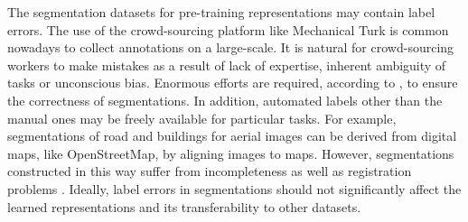 
The segmentation datasets for pre-training representations may contain label errors.
The use of the crowd-sourcing platform like Mechanical Turk is common nowadays to collect annotations on a large-scale.
It is natural for crowd-sourcing workers to make mistakes as a result of lack of expertise, inherent ambiguity of tasks or unconscious bias.
Enormous efforts are required, according to  \cite{lin2014microsoft,everingham2015pascal}, to ensure the correctness of segmentations.
In addition, automated labels other than the manual ones may be freely available for particular tasks.
For example, segmentations of road and buildings for aerial images can be derived from digital maps, like OpenStreetMap, by aligning images to maps.
However, segmentations constructed in this way suffer from incompleteness as well as registration problems \cite{mnih2012learning}.
Ideally, label errors in segmentations should not significantly affect the learned representations and its transferability to other datasets.



